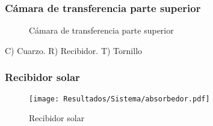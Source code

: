 \begin{frame}
	\frametitle{Cámara de transferencia parte superior}
	
	\begin{figure}
		\centering
		\caption{Cámara de transferencia parte superior}
	\end{figure}
	
	C) Cuarzo. R) Recibidor. T) Tornillo
	
\end{frame}

\begin{frame}
	\frametitle{Recibidor solar}
	
	\begin{figure}
		\centering
		\texttt{[image: Resultados/Sistema/absorbedor.pdf]}
		\caption{Recibidor solar}
	\end{figure}
	
\end{frame}